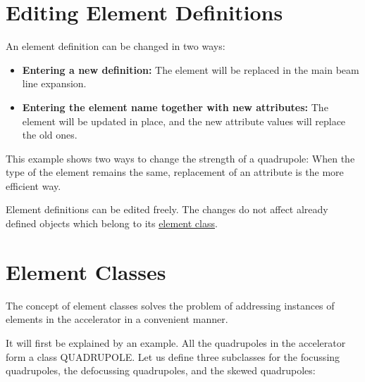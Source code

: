 %
\section{Editing Element Definitions}  
\label{sec:element_editing}

An element definition can be changed in two ways: 
\begin{itemize}
   \item \textbf{Entering a new definition:} The element will be
     replaced in the main beam line expansion.  
   \item \textbf{Entering the element name together with new
     attributes:} The element will be updated in place, and the new
     attribute values will replace the old ones.  
\end{itemize} 

This example shows two ways to change the strength of a quadrupole: 
When the type of the element remains the same, replacement of an
attribute is the more efficient way.  

Element definitions can be edited freely. The changes do not affect
already defined objects which belong to its
\href{elm_class.html}{element class}.  



%
\section{Element Classes}  
\label{sec:element_classes}
The concept of element classes solves the problem of addressing
instances of elements in the accelerator in a convenient manner. 

It will first be explained by an example. All the quadrupoles in the
accelerator form a class QUADRUPOLE. Let us define three subclasses for the
focussing quadrupoles, the defocussing quadrupoles, and the skewed
quadrupoles:  

